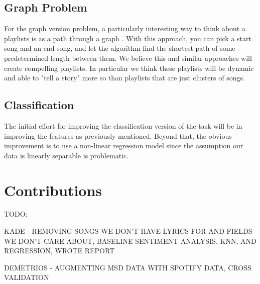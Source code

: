 \documentclass[10pt,journal,compsoc]{IEEEtran}
\begin{document}
\subsection{Graph Problem}
For the graph version problem, a particularly interesting way to think about a playlists is as a path through a graph \cite{Alghoniemy01anetwork}. With this approach, you can pick a start song and an end song, and let the algorithm find the shortest path of some predetermined length between them. We believe this and similar approaches will create compelling playlists. In particular we think these playlists will be dynamic and able to "tell a story" more so than playlists that are just clusters of songs.

\subsection{Classification}
The initial effort for improving the classification version of the task will be in improving the features as previously mentioned. Beyond that, the obvious improvement is to use a non-linear regression model since the assumption our data is linearly separable is problematic.

\section{Contributions}
TODO:

KADE - REMOVING SONGS WE DON'T HAVE LYRICS FOR AND FIELDS WE DON'T CARE ABOUT, BASELINE SENTIMENT ANALYSIS, KNN, AND REGRESSION, WROTE REPORT

DEMETRIOS - AUGMENTING MSD DATA WITH SPOTIFY DATA, CROSS VALIDATION

{}


%

\end{document}
